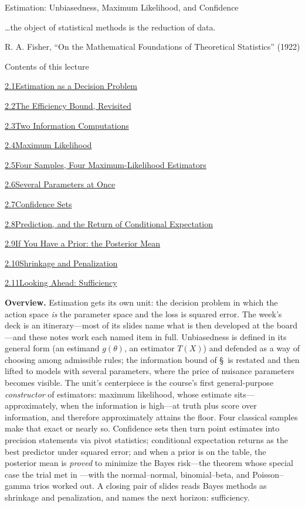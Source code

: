 \documentclass[main.tex]{subfiles}
\begin{document}
%
  {Estimation: Unbiasedness, Maximum Likelihood, and Confidence}

\epigraph{\ldots the object of statistical methods is the reduction of data.}%
{R. A. Fisher, ``On the Mathematical Foundations of Theoretical Statistics'' (1922)}

\begin{lecturecontents}{Contents of this lecture}
  \item \hyperlink{2.1}{2.1\quad Estimation as a Decision Problem}
  \item \hyperlink{2.2}{2.2\quad The Efficiency Bound, Revisited}
  \item \hyperlink{2.3}{2.3\quad Two Information Computations}
  \item \hyperlink{2.4}{2.4\quad Maximum Likelihood}
  \item \hyperlink{2.5}{2.5\quad Four Samples, Four Maximum-Likelihood Estimators}
  \item \hyperlink{2.6}{2.6\quad Several Parameters at Once}
  \item \hyperlink{2.7}{2.7\quad Confidence Sets}
  \item \hyperlink{2.8}{2.8\quad Prediction, and the Return of Conditional Expectation}
  \item \hyperlink{2.9}{2.9\quad If You Have a Prior: the Posterior Mean}
  \item \hyperlink{2.10}{2.10\quad Shrinkage and Penalization}
  \item \hyperlink{2.11}{2.11\quad Looking Ahead: Sufficiency}
\end{lecturecontents}

\bigskip
\noindent\textbf{Overview.} Estimation gets its own unit: the decision problem in which the
action space \emph{is} the parameter space and the loss is squared error. The week's deck is
an itinerary---most of its slides name what is then developed at the board---and these notes
work each named item in full. Unbiasedness is defined in its general form (an estimand
$g(\theta)$, an estimator $T(X)$) and defended as a way of choosing among admissible rules;
the information bound of \S\, is restated and then lifted to models with several
parameters, where the price of nuisance parameters becomes visible. The unit's centerpiece is
the course's first general-purpose \emph{constructor} of estimators: maximum likelihood,
whose estimate sits---approximately, when the information is high---at truth plus score over
information, and therefore approximately attains the floor. Four classical samples make that
exact or nearly so. Confidence sets then turn point estimates into precision statements via
pivot statistics; conditional expectation returns as the best predictor under squared error;
and when a prior is on the table, the posterior mean is \emph{proved} to minimize the Bayes
risk---the theorem whose special case the trial met in ---with the
normal--normal, binomial--beta, and Poisson--gamma trios worked out. A closing pair of
slides reads Bayes methods as shrinkage and penalization, and names the next horizon:
sufficiency. 
\end{document}
